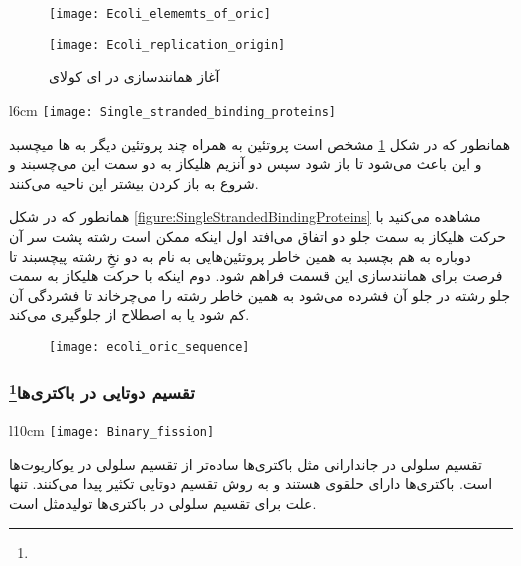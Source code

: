 \begin{figure}[htbp]
	\centering
	\texttt{[image: Ecoli\_elememts\_of\_oric]}
\end{figure}

\begin{figure}[htbp]
	\centering
	\texttt{[image: Ecoli\_replication\_origin]}
	\caption{آغاز همانندسازی در ای کولای}
	\label{figure:ecoliInitialReproduction}
\end{figure}

\begin{wrapfigure}{l}{6cm}
	\centering
	\texttt{[image: Single\_stranded\_binding\_proteins]}
	\caption{}
	\label{figure:SingleStrandedBindingProteins}
\end{wrapfigure}

همانطور که در شکل
\ref{figure:ecoliInitialReproduction}
مشخص است پروتئین
به همراه چند پروتئین دیگر
به
ها میچسبد و این باعث می‌شود تا
باز شود سپس دو آنزیم هلیکاز به دو سمت این
می‌چسبند و شروع به باز کردن بیشتر این ناحیه می‌کنند.

همانطور که در شکل
\ref{figure:SingleStrandedBindingProteins}
مشاهده می‌کنید با حرکت هلیکاز به سمت جلو دو اتفاق می‌افتد اول اینکه ممکن است رشته پشت سر آن دوباره به هم بچسبد به همین خاطر پروتئین‌هایی به نام
به دو نخِ رشته
پیچسبند تا فرصت برای همانندسازی این قسمت فراهم شود. دوم اینکه با حرکت هلیکاز به سمت جلو رشته
در جلو آن فشرده می‌شود به همین خاطر
رشته
را می‌چرخاند تا فشردگی آن کم شود یا به اصطلاح از
جلوگیری می‌کند.

\begin{figure}[htbp]
	\centering
	\texttt{[image: ecoli\_oric\_sequence]}
\end{figure}

\pagebreak
\subsubsection{تقسیم دوتایی در باکتری‌ها\protect\footnote{}}

\begin{wrapfigure}[15]{l}{10cm}
	\centering
	\texttt{[image: Binary\_fission]}
\end{wrapfigure}

تقسیم سلولی در جاندارانی مثل باکتری‌ها ساده‌تر از تقسیم سلولی در یوکاریوت‌ها است. باکتری‌ها دارای
حلقوی هستند و به روش تقسیم دوتایی تکثیر پیدا می‌کنند. تنها علت برای تقسیم سلولی در باکتری‌ها تولیدمثل است.

